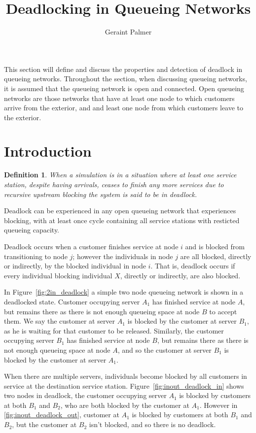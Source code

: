 \documentclass{article}
\title{Deadlocking in Queueing Networks}
\author{Geraint Palmer}
\date{}
\newtheorem{definition}{Definition}
\begin{document}
\onehalfspacing

\maketitle

This section will define and discuss the properties and detection of deadlock in queueing networks.
Throughout the section, when discussing queueing networks, it is assumed that
the queueing network is open and connected.
Open queueing networks are those networks that have at least one node to which customers arrive from the exterior, and and least one node from which customers leave to the exterior.

\section{Introduction}

\begin{definition}
    When a simulation is in a situation where at least one service station,
    despite having arrivals, ceases to finish any more services
    due to recursive upstream blocking the system is said to be in deadlock.
\end{definition}

Deadlock can be experienced in any open queueing network that experiences
blocking, with at least once cycle containing all service stations with
resticted queueing capacity.

Deadlock occurs when a customer finishes service at node $i$ and is blocked from transitioning to node $j$; however the individuals in node $j$ are all blocked, directly or indirectly, by the blocked individual in node $i$.
That is, deadlock occurs if every individual blocking individual $X$, directly or indirectly, are also blocked.

In Figure~\ref{fig:2in_deadlock} a simple two node queueing network is shown in a deadlocked state.
Customer occupying server $A_1$ has finished service at node $A$, but remains there as there is not
enough queueing space at node $B$ to accept them.
We say the customer at server $A_1$ is blocked by the customer at server $B_1$, as he is waiting for that customer to be released.
Similarly, the customer occupying server $B_1$ has finished service at node $B$, but remains there as there is not enough queueing space at node $A$, and so the customer at server $B_1$ is blocked by the customer at server $A_1$.

When there are multiple servers, individuals become blocked by all customers in
service at the destination service station.
Figure~\ref{fig:inout_deadlock_in} shows two nodes in deadlock, the customer occupying server $A_1$ is blocked by customers at both $B_1$ and $B_2$, who are both blocked by the customer at $A_1$.
However in \ref{fig:inout_deadlock_out}, customer at $A_1$ is blocked by customers at both $B_1$ and $B_2$, but the customer at $B_2$ isn't blocked, and so there is no deadlock.
\end{document}
